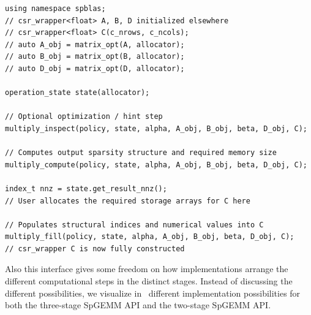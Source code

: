 \documentclass[manuscript,review]{acmart}
\begin{document}
\begin{listing}[htbp]
  \caption{Alternative two-stage API for \texttt{SpGEMM} combining symbolic and numeric resolution.}
  \label{lst:spgemm_twostage}
  \begin{verbatim}
using namespace spblas;
// csr_wrapper<float> A, B, D initialized elsewhere
// csr_wrapper<float> C(c_nrows, c_ncols);
// auto A_obj = matrix_opt(A, allocator);
// auto B_obj = matrix_opt(B, allocator);
// auto D_obj = matrix_opt(D, allocator);

operation_state state(allocator);

// Optional optimization / hint step
multiply_inspect(policy, state, alpha, A_obj, B_obj, beta, D_obj, C);

// Computes output sparsity structure and required memory size
multiply_compute(policy, state, alpha, A_obj, B_obj, beta, D_obj, C);

index_t nnz = state.get_result_nnz();
// User allocates the required storage arrays for C here

// Populates structural indices and numerical values into C
multiply_fill(policy, state, alpha, A_obj, B_obj, beta, D_obj, C);
// csr_wrapper C is now fully constructed
  \end{verbatim}
\end{listing}

Also this interface gives some freedom on how implementations arrange the different computational steps in the distinct stages. Instead of discussing the different possibilities, we visualize in~ different implementation possibilities for both the three-stage SpGEMM API and the two-stage SpGEMM API.








\end{document}
